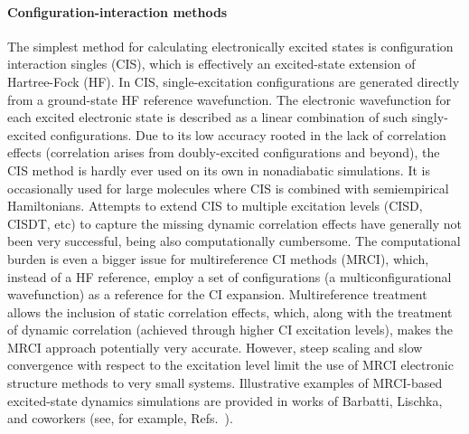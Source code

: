 \documentclass[9pt,bestpractices,pubversion]{livecoms}
\begin{document}
\paragraph{Configuration-interaction methods}
The simplest method for calculating electronically excited states is configuration interaction singles (CIS), which is effectively an excited-state extension of Hartree-Fock (HF). In CIS, single-excitation configurations are generated directly from a ground-state HF reference wavefunction.\cite{DH05} The electronic wavefunction for each excited electronic state is described as a linear combination of such singly-excited configurations. Due to its low accuracy rooted in the lack of correlation effects (correlation arises from doubly-excited configurations and beyond), the CIS method is hardly ever used on its own in nonadiabatic simulations. It is occasionally used for large molecules where CIS is combined with semiempirical Hamiltonians.\cite{nelson2014nonadiabatic} 
Attempts to extend CIS to multiple excitation levels (CISD, CISDT, etc) to capture the missing dynamic correlation effects have generally not been very successful,\cite{gonzalez2012progress} being also computationally cumbersome. The computational burden is even a bigger issue for multireference CI methods (MRCI), which, instead of a HF reference, employ a set of configurations (a multiconfigurational wavefunction) as a reference for the CI expansion. Multireference treatment allows the inclusion of static correlation effects, which, along with the treatment of dynamic correlation (achieved through higher CI excitation levels), makes the MRCI approach potentially very accurate.\cite{lischka2018multireference} However, steep scaling and slow convergence with respect to the excitation level limit the use of MRCI electronic structure methods to very small systems. Illustrative examples of MRCI-based excited-state dynamics simulations are provided in works of Barbatti, Lischka, and coworkers (see, for example, Refs.~\cite{vazdar2009excited,szymczak2008mechanism}).
\end{document}
